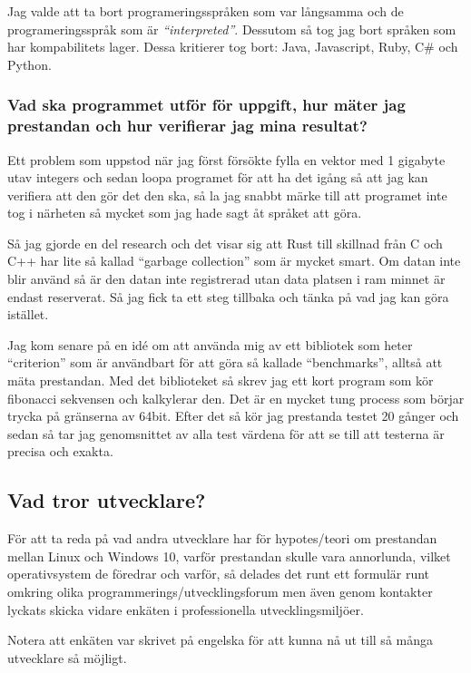 \documentclass[12pt, a4paper]{report}
\begin{document}
Jag valde att ta bort programeringsspråken som var långsamma och de programeringsspråk som är \textit{``interpreted''}\cite{Interpreted-language}. Dessutom så tog jag bort språken som har kompabilitets lager. Dessa kritierer tog bort: Java, Javascript, Ruby, C\# och Python.

\subsubsection{Vad ska programmet utför för uppgift, hur mäter jag prestandan och hur verifierar jag mina resultat?}

Ett problem som uppstod när jag först försökte fylla en vektor med 1 gigabyte utav integers och sedan loopa programet för att ha det igång så att jag kan verifiera att den gör det den ska, så la jag snabbt märke till att programet inte tog i närheten så mycket som jag hade sagt åt språket att göra.

Så jag gjorde en del research och det visar sig att Rust till skillnad från C och C++ har lite så kallad ``garbage collection'' som är mycket smart. Om datan inte blir använd så är den datan inte registrerad utan data platsen i ram minnet är endast reserverat. Så jag fick ta ett steg tillbaka och tänka på vad jag kan göra istället.
 
Jag kom senare på en idé om att använda mig av ett bibliotek som heter ``criterion'' som är användbart för att göra så kallade ``benchmarks'', alltså att mäta prestandan. Med det biblioteket så skrev jag ett kort program som kör fibonacci sekvensen och kalkylerar den. Det är en mycket tung process som börjar trycka på gränserna av 64bit. Efter det så kör jag prestanda testet 20 gånger och sedan så tar jag genomsnittet av alla test värdena för att se till att testerna är precisa och exakta.
 
 
\subsection{Vad tror utvecklare?}
 
   För att ta reda på vad andra utvecklare har för hypotes/teori om prestandan mellan Linux och Windows 10, varför prestandan skulle vara annorlunda, vilket operativsystem de föredrar och varför, så delades det runt ett formulär runt omkring olika programmerings/utvecklingsforum men även genom kontakter lyckats skicka vidare enkäten i professionella utvecklingsmiljöer.
 
   Notera att enkäten var skrivet på engelska för att kunna nå ut till så många utvecklare så möjligt.
    
\end{document}
